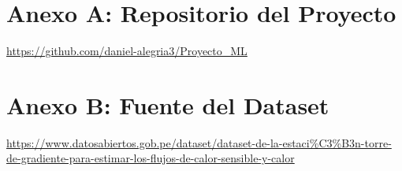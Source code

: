 

\maketitle
\tableofcontents
\newpage





\newpage

\newpage

\newpage

\appendix

\section*{Anexo A: Repositorio del Proyecto}
\label{sec:anexoA}
\url{https://github.com/daniel-alegria3/Proyecto_ML}

\section*{Anexo B: Fuente del Dataset}
\label{sec:anexoB}
\url{https://www.datosabiertos.gob.pe/dataset/dataset-de-la-estaci\%C3\%B3n-torre-de-gradiente-para-estimar-los-flujos-de-calor-sensible-y-calor}



